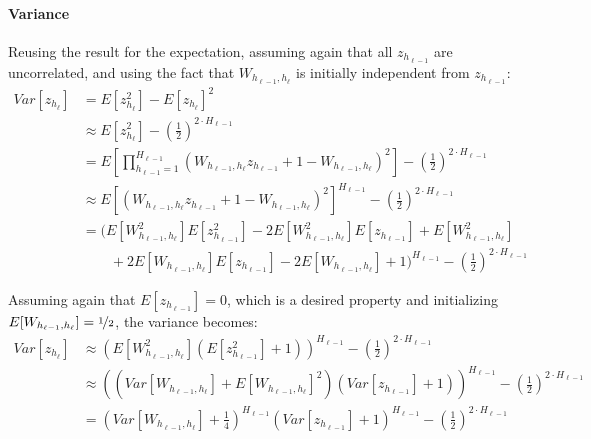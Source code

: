 \paragraph{Variance} Reusing the result for the expectation, assuming again that all $z_{h_{\ell-1}}$ are uncorrelated, and using the fact that $W_{h_{\ell-1},h_\ell}$ is initially independent from $z_{h_{\ell-1}}$:
\begin{equation}
\begin{aligned}
Var[z_{h_\ell}] &= E[z_{h_\ell}^2] - E[z_{h_\ell}]^2 \\
&\approx E[z_{h_\ell}^2] - \left(\frac{1}{2}\right)^{2 \cdot H_{\ell-1}} \\
&= E\left[\prod_{h_{\ell-1}=1}^{H_{\ell-1}}\left(W_{h_{\ell-1},h_\ell} z_{h_{\ell-1}} + 1 - W_{h_{\ell-1},h_\ell}\right)^2\right] - \left(\frac{1}{2}\right)^{2 \cdot H_{\ell-1}} \\
&\approx E[\left(W_{h_{\ell-1},h_\ell} z_{h_{\ell-1}} + 1 - W_{h_{\ell-1},h_\ell}\right)^2]^{H_{\ell-1}}- \left(\frac{1}{2}\right)^{2 \cdot H_{\ell-1}} \\
&= \Big(E[W_{h_{\ell-1},h_\ell}^2] E[z_{h_{\ell-1}}^2] - 2 E[W_{h_{\ell-1},h_\ell}^2] E[z_{h_{\ell-1}}]+ E[W_{h_{\ell-1},h_\ell}^2] \\
&\quad\quad + 2 E[W_{h_{\ell-1},h_\ell}] E[z_{h_{\ell-1}}] - 2 E[W_{h_{\ell-1},h_\ell}] + 1\Big)^{H_{\ell-1}}- \left(\frac{1}{2}\right)^{2 \cdot H_{\ell-1}}
\end{aligned}
\end{equation}

Assuming again that $E[z_{h_{\ell-1}}] = 0$, which is a desired property and initializing $E[W_{h_{\ell-1},h_\ell}] = \nicefrac{1}{2}$, the variance becomes:
\begin{equation}
\begin{aligned}
Var[z_{h_\ell}] &\approx \left(E[W_{h_{\ell-1},h_\ell}^2] \left(E[z_{h_{\ell-1}}^2] + 1\right)\right)^{H_{\ell-1}}- \left(\frac{1}{2}\right)^{2 \cdot H_{\ell-1}} \\
&\approx \left(\left(Var[W_{h_{\ell-1},h_\ell}] + E[W_{h_{\ell-1},h_\ell}]^2\right) \left(Var[z_{h_{\ell-1}}] + 1\right)\right)^{H_{\ell-1}}- \left(\frac{1}{2}\right)^{2 \cdot H_{\ell-1}} \\
&= \left(Var[W_{h_{\ell-1},h_\ell}] + \frac{1}{4}\right)^{H_{\ell-1}} \left(Var[z_{h_{\ell-1}}] + 1\right)^{H_{\ell-1}} - \left(\frac{1}{2}\right)^{2 \cdot H_{\ell-1}}
\end{aligned}
\end{equation}

